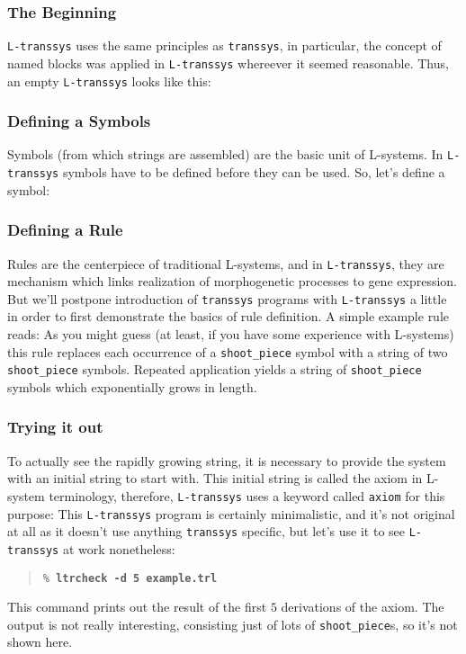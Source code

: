 \documentclass[12pt]{article}
\newcommand{\transsys}{\texttt{transsys}}
\newcommand{\ltranssys}{\texttt{L-}\transsys}
\newcommand{\codeword}[1]{\texttt{#1}}
\newcommand{\cmdline}[2][\% ]{\texttt{#1\textbf{#2}}}
\begin{document}
\subsubsection{The Beginning}

\ltranssys{} uses the same principles as
\transsys{}, in particular, the concept of named blocks was applied in
\ltranssys{} whereever it seemed reasonable. Thus, an empty
\ltranssys{} looks like this:


\subsubsection{Defining a Symbols}

Symbols (from which strings are assembled) are the basic unit of
L-systems. In \ltranssys{} symbols have to be defined before they can
be used. So, let's define a symbol:


\subsubsection{Defining a Rule}

Rules are the centerpiece of traditional L-systems, and in
\ltranssys{}, they are mechanism which links realization of
morphogenetic processes to gene expression. But we'll postpone
introduction of \transsys{} programs with \ltranssys{} a little in
order to first demonstrate the basics of rule definition. A simple
example rule reads:
As you might guess (at least, if you have some experience with
L-systems) this rule replaces each occurrence of a
\codeword{shoot\_piece} symbol with a string of two
\codeword{shoot\_piece} symbols. Repeated application yields a string
of \codeword{shoot\_piece} symbols which exponentially grows in length.


\subsubsection{Trying it out}

To actually see the rapidly growing string, it is necessary to provide
the system with an initial string to start with. This initial string
is called the axiom in L-system terminology, therefore, \ltranssys{}
uses a keyword called \codeword{axiom} for this purpose:
This \ltranssys{} program is certainly minimalistic, and it's not
original at all as it doesn't use anything \transsys{} specific, but
let's use it to see \ltranssys{} at work nonetheless:
\begin{quote}
\cmdline{ltrcheck -d 5 example.trl}
\end{quote}
This command prints out the result of the first $5$ derivations of the
axiom. The output is not really interesting, consisting just of lots
of \codeword{shoot\_piece}s, so it's not shown here.
\end{document}
